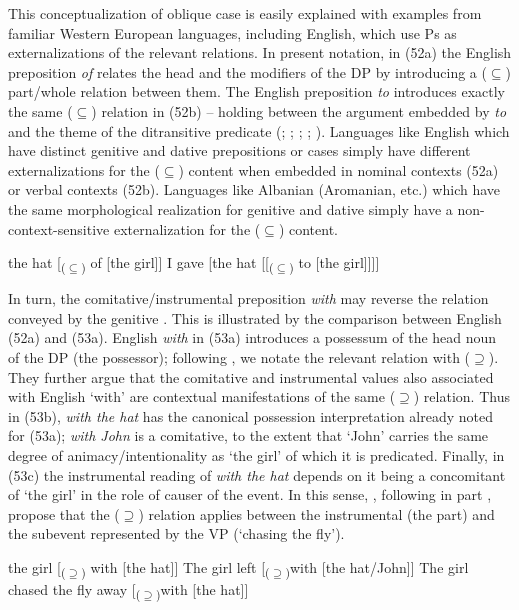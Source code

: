 \documentclass[output=paper]{langsci/langscibook}
\begin{document}
This conceptualization of oblique case is easily explained with examples from familiar Western European languages, including English, which use Ps as externalizations of the relevant relations. In present notation, in (52a) the English preposition \textit{of} relates the head and the modifiers of the DP by introducing a ($\subseteq$) part/whole relation between them. The English preposition \textit{to} introduces exactly the same ($\subseteq$) relation in (52b) – holding between the argument embedded by \textit{to} and the theme of the ditransitive predicate (\citealt{Kayne1984}; \citealt{Pesetsky1995}; \citealt{Harley2002}; \citealt{Beck2002}; \citealt{Manzini2016}).  Languages like English which have distinct genitive and dative prepositions or cases simply have different externalizations for the ($\subseteq$) content when embedded in nominal contexts (52a) or verbal contexts (52b). Languages like Albanian (Aromanian, etc.) which have the same morphological realization for genitive and dative simply have a non-context-sensitive externalization for the ($\subseteq$) content.

\ea%
    \label{ex:manzini:52}
    \ea  the hat [\textsubscript{($\subseteq$)} of [the girl]]
    \ex  I gave [the hat [[\textsubscript{($\subseteq$)} to [the girl]]]]
    \z    
\z


In turn, the comitative/instrumental preposition \textit{with} may reverse the relation conveyed by the genitive \citep{Levinson2011}. This is illustrated by the comparison between English (52a) and (53a). English \textit{with} in (53a) introduces a possessum of the head noun of the DP (the possessor); following \citet{Franco2017}, we notate the relevant relation with ($\supseteq$). They further argue that the comitative and instrumental values also associated with English ‘with’ are contextual manifestations of the same ($\supseteq$) relation. Thus in (53b), \textit{with the hat} has the canonical possession interpretation already noted for (53a); \textit{with John} is a comitative, to the extent that ‘John’ carries the same degree of animacy/intentionality as ‘the girl’ of which it is predicated. Finally, in (53c) the instrumental reading of \textit{with the hat} depends on it being a concomitant of ‘the girl’ in the role of causer of the event. In this sense, \citet{Franco2017}, following in part \citet{Bruening2012}, propose that the ($\supseteq$) relation applies between the instrumental (the part) and the subevent represented by the VP (‘chasing the fly’).

\ea%
    \label{ex:manzini:53}
    \ea  the girl [\textsubscript{($\supseteq$)} with [the hat]]
    \ex  The girl left [\textsubscript{($\supseteq$)}with [the hat/John]]
    \ex  The girl chased the fly away [\textsubscript{($\supseteq$)}with [the hat]]
    \z
\z
  
\end{document}
